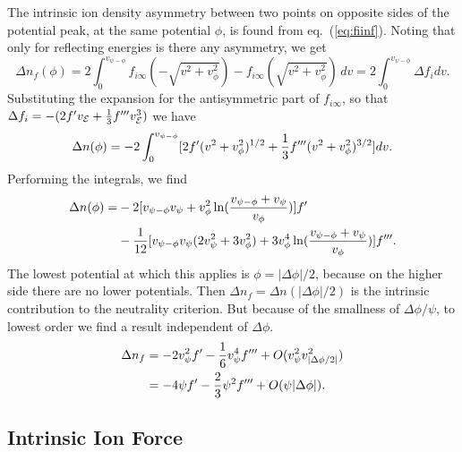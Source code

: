 \documentclass[pre]{revtex4-2}
\def\energy{{\cal E}}
\begin{document}
The intrinsic ion density asymmetry between two points on opposite
sides of the potential peak, at the same potential $\phi$, is found
from eq.\ (\ref{eq:fiinf}). Noting that only for reflecting energies
is there any asymmetry, we get
\begin{equation}
  \label{eq:Dnf}
  \Delta n_f(\phi)=2\int_0^{v_{\psi-\phi}} f_{i\infty}(-\sqrt{v^2+v_\phi^2})-
  f_{i\infty}(\sqrt{v^2+v_\phi^2})\,dv = 2\int_0^{v_{\psi-\phi}} \Delta f_i
  dv.
\end{equation}
 Substituting
the expansion for the antisymmetric part of $f_{i\infty}$, so that
$\Delta f_i= -(2f' v_\energy+{1\over 3}f'''v_\energy^3)$ we have
\begin{equation}
  \label{eq:nfexp}
  \Delta n(\phi)=-2\int_0^{v_{\psi-\phi}}[2f'(v^2+v_\phi^2)^{1/2}+{1\over 3}
  f'''(v^2+v_\phi^2)^{3/2}]dv.
\end{equation}
Performing the integrals, we find
\begin{equation}
  \label{eq:Dnint}
  \begin{split}
  \Delta n(\phi) =& -2[v_{\psi-\phi} v_\psi +v_\phi^2\ln({v_{\psi-\phi}+v_\psi\over v_\phi})]f'\\
  &-{1\over 12}[v_{\psi-\phi} v_\psi(2v_\psi^2+3v_\phi^2)+3v_\phi^4 \ln({v_{\psi-\phi}+v_\psi\over v_\phi})]f'''.
  \end{split}
\end{equation}
The lowest potential at which this applies is $\phi=|\Delta\phi|/2$,
because on the higher side there are no lower potentials. Then
$\Delta n_f=\Delta n(|\Delta\phi|/2)$ is the intrinsic contribution to the
neutrality criterion. But because of the smallness of $\Delta\phi/\psi$, to
lowest order we find a result independent of $\Delta\phi$.
\begin{equation}
  \label{eq:Dnint2}
  \begin{split}
  \Delta n_f&=-2v_\psi^2f'-{1\over 6} v_\psi^4f'''
  +O(v_\psi^2v_{|\Delta\phi/2|}^2)\\
  &=-4\psi f' -{2\over 3}\psi^2 f''' +O(\psi|\Delta\phi|).
  \end{split}
\end{equation}

\subsection{Intrinsic Ion Force}
\end{document}
